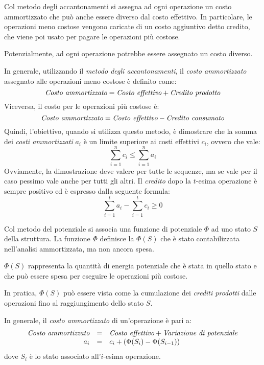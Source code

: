 \newpage
\begin{definition}
    Col metodo degli accantonamenti si assegna ad ogni operazione un costo
    ammortizzato che può anche essere diverso dal costo effettivo. In particolare,
    le operazioni meno costose vengono caricate di un costo aggiuntivo detto
    credito, che viene poi usato per pagare le operazioni più costose.
\end{definition}
\begin{note}
    Potenzialmente, ad ogni operazione potrebbe essere assegnato un costo diverso.
\end{note}

\noindent
In generale, utilizzando il \emph{metodo degli accantonamenti}, il \emph{costo
ammortizzato} assegnato alle operazioni meno costose è definito come:
\[\emph{Costo ammortizzato}=\emph{Costo effettivo}+\emph{Credito prodotto}\]
Viceversa, il costo per le operazioni più costose è:
\[\emph{Costo ammortizzato}=\emph{Costo effettivo}-\emph{Credito consumato}\]
Quindi, l'obiettivo, quando si utilizza questo metodo, è dimostrare che la somma
dei \emph{costi ammortizzati} $a_i$ è un limite superiore ai costi effettivi
$c_i$, ovvero che vale:
\[\sum_{i=1}^nc_i\leq\sum_{i=1}^na_i\]
Ovviamente, la dimostrazione deve valere per tutte le sequenze, ma se vale per il
caso pessimo vale anche per tutti gli altri. Il \emph{credito} dopo la $t$-esima
operazione è sempre positivo ed è espresso dalla seguente formula:
\[\sum_{i=1}^ta_i-\sum_{i=1}^tc_i\geq0\]

\begin{definition}
    Col metodo del potenziale si associa una funzione di potenziale $\Phi$ ad
    uno stato $S$ della struttura. La funzione $\Phi$ definisce la  $\Phi(S)$ che è stato contabilizzata nell'analisi ammortizzata,
    ma non ancora spesa.
\end{definition}
\begin{note}
    $\Phi(S)$ rappresenta la quantità di energia potenziale che è stata
     in quello stato e che può essere spesa per eseguire le
    operazioni più costose.
\end{note}\noindent
In pratica, $\Phi(S)$ può essere vista come la cumulazione dei \emph{crediti
prodotti} dalle operazioni fino al raggiungimento dello stato $S$.

\bigskip\noindent
In generale, il \emph{costo ammortizzato} di un'operazione è pari a:
\[\begin{array}[t]{rcl}
    \emph{Costo ammortizzato} & = & \emph{Costo effettivo}+\emph{Variazione di potenziale}\\
    a_i & = & c_i + (\Phi(S_i)-\Phi(S_{i-1}))
\end{array}\]
dove $S_i$ è lo stato associato all'$i$-esima operazione.

